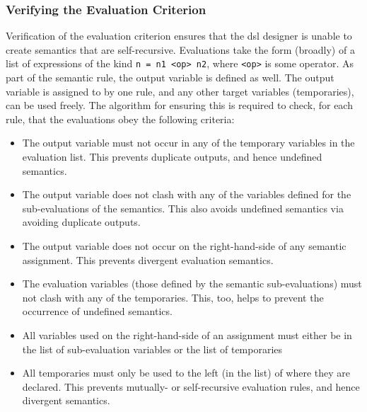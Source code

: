 \subsubsection{Verifying the Evaluation Criterion} %
\label{ssub:verifying_the_evaluation_criterion}
Verification of the evaluation criterion ensures that the \gls{dsl} designer is unable to create semantics that are self-recursive. 
Evaluations take the form (broadly) of a list of expressions of the kind \texttt{n = n1 <op> n2}, where \texttt{<op>} is some operator.
As part of the semantic rule, the output variable is defined as well. 
The output variable is assigned to by one rule, and any other target variables (temporaries), can be used freely.
The algorithm for ensuring this is required to check, for each rule, that the evaluations obey the following criteria:
\begin{itemize}
    \item The output variable must not occur in any of the temporary variables in the evaluation list.
    This prevents duplicate outputs, and hence undefined semantics.
    \item The output variable does not clash with any of the variables defined for the sub-evaluations of the semantics.
    This also avoids undefined semantics via avoiding duplicate outputs. 
    \item The output variable does not occur on the right-hand-side of any semantic assignment.
    This prevents divergent evaluation semantics.
    \item The evaluation variables (those defined by the semantic sub-evaluations) must not clash with any of the temporaries.
    This, too, helps to prevent the occurrence of undefined semantics.
    \item All variables used on the right-hand-side of an assignment must either be in the list of sub-evaluation variables or the list of temporaries 
    \item All temporaries must only be used to the left (in the list) of where they are declared.
    This prevents mutually- or self-recursive evaluation rules, and hence divergent semantics.
\end{itemize}

